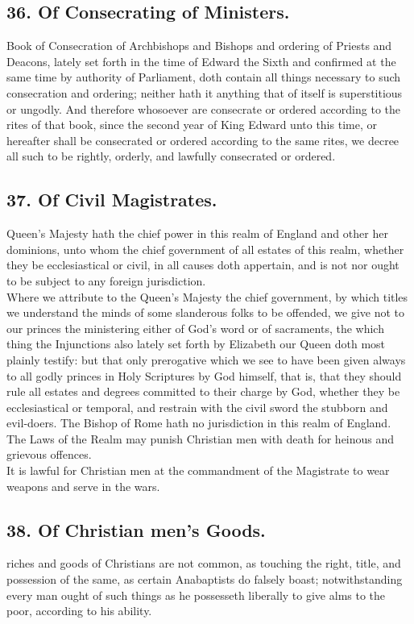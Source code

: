 \subsection{36. Of Consecrating of Ministers.}
 Book of Consecration of Archbishops and Bishops and ordering of Priests and Deacons, lately set forth in the time of Edward the Sixth and confirmed at the same time by authority of Parliament, doth contain all things necessary to such consecration and ordering; neither hath it anything that of itself is superstitious or ungodly. And therefore whosoever are consecrate or ordered according to the rites of that book, since the second year of King Edward unto this time, or hereafter shall be consecrated or ordered according to the same rites, we decree all such to be rightly, orderly, and lawfully consecrated or ordered.

\subsection{37. Of Civil Magistrates.}
 Queen's Majesty hath the chief power in this realm of England and other her dominions, unto whom the chief government of all estates of this realm, whether they be ecclesiastical or civil, in all causes doth appertain, and is not nor ought to be subject to any foreign jurisdiction.\\
Where we attribute to the Queen's Majesty the chief government, by which titles we understand the minds of some slanderous folks to be offended, we give not to our princes the ministering either of God's word or of sacraments, the which thing the Injunctions also lately set forth by Elizabeth our Queen doth most plainly testify: but that only prerogative which we see to have been given always to all godly princes in Holy Scriptures by God himself, that is, that they should rule all estates and degrees committed to their charge by God, whether they be ecclesiastical or temporal, and restrain with the civil sword the stubborn and evil-doers. The Bishop of Rome hath no jurisdiction in this realm of England.\\
The Laws of the Realm may punish Christian men with death for heinous and grievous offences.\\
It is lawful for Christian men at the commandment of the Magistrate to wear weapons and serve in the wars.

\subsection{38. Of Christian men's Goods.}
 riches and goods of Christians are not common, as touching the right, title, and possession of the same, as certain Anabaptists do falsely boast; notwithstanding every man ought of such things as he possesseth liberally to give alms to the poor, according to his ability.

